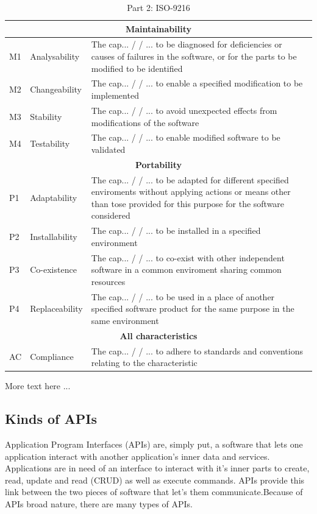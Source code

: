 \documentclass{article}
\begin{document}
\begin{table}[H]
\centering
\begin{tabularx}{\columnwidth}{|l|l|X|}
\hline
\multicolumn{3}{c}{\textbf{Maintainability}} \\ \hline
M1&Analysability & The cap... / / ... to be diagnosed for deficiencies or causes of failures in the
software, or for the parts to be modified to be identified \\ \hline
M2&Changeability & The cap... / / ... to enable a specified modification to be implemented \\ \hline
M3&Stability & The cap... / / ... to avoid unexpected effects from modifications of the software \\ \hline
M4&Testability &The cap... / / ... to enable modified software to be validated \\ \hline

\multicolumn{3}{c}{\textbf{Portability}} \\ \hline
P1& Adaptability &The cap... / / ... to be adapted for different specified enviroments without applying
actions or means other than tose provided for this purpose for the software considered \\ \hline
P2&Installability& The cap... / / ... to be installed in a specified environment \\ \hline
P3&Co-existence &The cap... / / ... to co-exist with other independent software in a common enviroment sharing
common resources \\ \hline
P4&Replaceability &The cap... / / ... to be used in a place of another specified software product for the same
purpose in the same environment \\ \hline

\multicolumn{3}{c}{\textbf{All characteristics}} \\ \hline
AC&Compliance & The cap... / / ... to adhere to standards and conventions relating to the
characteristic \\ \hline
\end{tabularx}
\caption{Part 2: ISO-9216}
\label{tabl:standard2}
\end{table}

More text here ...
\subsection{Kinds of APIs}

Application Program Interfaces (APIs) are, simply put, a software that
lets one application interact with another application's inner data and
services. Applications are in need of an interface to interact with it's
inner parts to create, read, update and read (CRUD) as well as execute
commands. APIs provide this link between the two pieces of software that let's
them communicate.Because of APIs broad nature, there are many types of
APIs.
\end{document}
